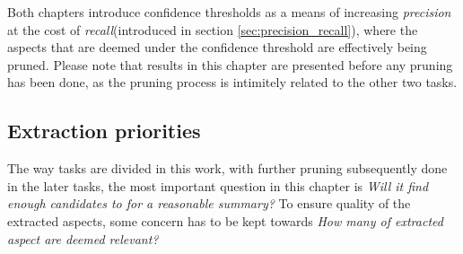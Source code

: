 \documentclass[a4paper,11pt]{kth-mag}
\begin{document}
Both chapters introduce confidence thresholds as a means of increasing
\emph{precision} at the cost of \emph{recall}(introduced in section \ref{sec:precision_recall}),
where the aspects that are deemed under the confidence threshold are effectively being pruned.
Please note that results in this chapter are presented
before any pruning has been done, as the pruning process is intimitely related
to the other two tasks.


\subsection{Extraction priorities}
The way tasks are divided in this work, with further pruning subsequently done in
the later tasks, the most important question in this chapter is
\emph{Will it find enough candidates to for a reasonable summary?}
To ensure quality of the extracted aspects, some concern has to be kept towards \emph{How many
  of extracted aspect are deemed relevant?}

%


\end{document}
